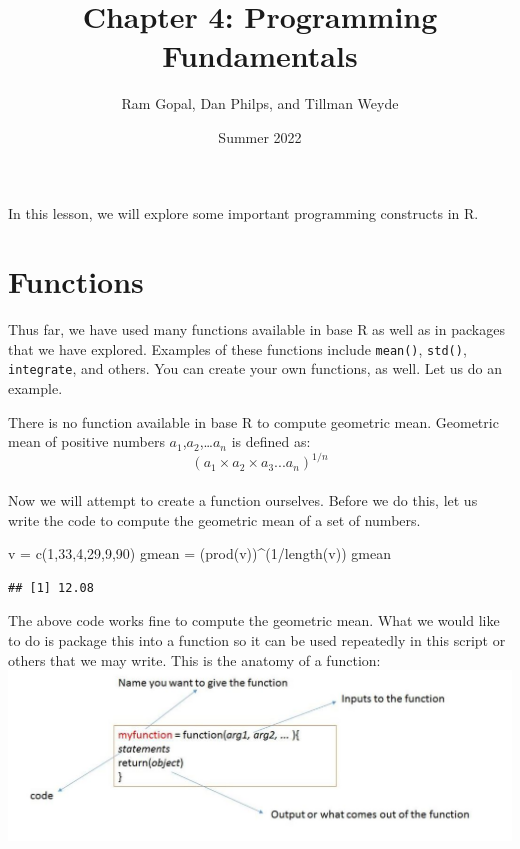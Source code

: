 \documentclass[
]{article}
\title{Chapter 4: Programming Fundamentals}
\author{Ram Gopal, Dan Philps, and Tillman Weyde}
\date{Summer 2022}
\newenvironment{Shaded}{\begin{snugshade}}{\end{snugshade}}
\newcommand{\DecValTok}[1]{\textcolor[rgb]{0.00,0.00,0.81}{#1}}
\newcommand{\FunctionTok}[1]{\textcolor[rgb]{0.00,0.00,0.00}{#1}}
\newcommand{\NormalTok}[1]{#1}
\newcommand{\OtherTok}[1]{\textcolor[rgb]{0.56,0.35,0.01}{#1}}
\newcommand{\SpecialCharTok}[1]{\textcolor[rgb]{0.00,0.00,0.00}{#1}}
\begin{document}
\maketitle

{
\setcounter{tocdepth}{4}
\tableofcontents
}
In this lesson, we will explore some important programming constructs in
R.

\hypertarget{functions}{%
\section{Functions}\label{functions}}

Thus far, we have used many functions available in base R as well as in
packages that we have explored. Examples of these functions include
\texttt{mean()}, \texttt{std()}, \texttt{integrate}, and others. You can
create your own functions, as well. Let us do an example.

There is no function available in base R to compute geometric mean.
Geometric mean of positive numbers \(a_1\),\(a_2\),\ldots{}\(a_n\) is
defined as:\\
\[(a_1\times a_2\times a_3...a_n)^{1/n}\]\\
Now we will attempt to create a function ourselves. Before we do this,
let us write the code to compute the geometric mean of a set of numbers.

\begin{Shaded}
\begin{Highlighting}[]
\NormalTok{v }\OtherTok{=} \FunctionTok{c}\NormalTok{(}\DecValTok{1}\NormalTok{,}\DecValTok{33}\NormalTok{,}\DecValTok{4}\NormalTok{,}\DecValTok{29}\NormalTok{,}\DecValTok{9}\NormalTok{,}\DecValTok{90}\NormalTok{)}
\NormalTok{gmean }\OtherTok{=}\NormalTok{ (}\FunctionTok{prod}\NormalTok{(v))}\SpecialCharTok{\^{}}\NormalTok{(}\DecValTok{1}\SpecialCharTok{/}\FunctionTok{length}\NormalTok{(v))}
\NormalTok{gmean}
\end{Highlighting}
\end{Shaded}

\begin{verbatim}
## [1] 12.08
\end{verbatim}

The above code works fine to compute the geometric mean. What we would
like to do is package this into a function so it can be used repeatedly
in this script or others that we may write. This is the anatomy of a
function:\\
\includegraphics{FunctionPic.JPG}
\end{document}
